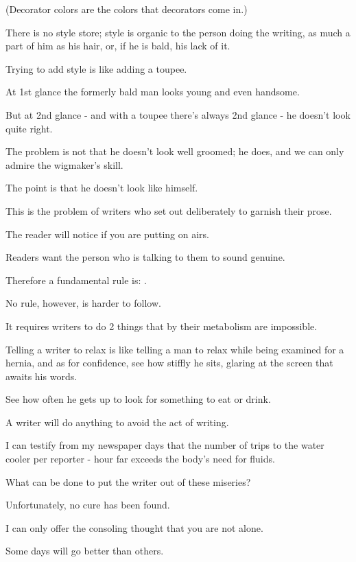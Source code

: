 \documentclass{book}
\numberwithin{equation}{section}
\begin{document}
(Decorator colors are the colors that decorators come in.)

There is no style store; style is organic to the person doing the writing, as much a part of him as his hair, or, if he is bald, his lack of it.

Trying to add style is like adding a toupee.

At 1st glance the formerly bald man looks young and even handsome.

But at 2nd glance - and with a toupee there's always 2nd glance - he doesn't look quite right.

The problem is not that he doesn't look well groomed; he does, and we can only admire the wigmaker's skill.

The point is that he doesn't look like himself.

%
This is the problem of writers who set out deliberately to garnish their prose.


The reader will notice if you are putting on airs.

Readers want the person who is talking to them to sound genuine.

Therefore a fundamental rule is: .

No rule, however, is harder to follow.

It requires writers to do 2 things that by their metabolism are impossible.


%
Telling a writer to relax is like telling a man to relax while being examined for a hernia, and as for confidence, see how stiffly he sits, glaring at the screen that awaits his words.

See how often he gets up to look for something to eat or drink.

A writer will do anything to avoid the act of writing.

I can testify from my newspaper days that the number of trips to the water cooler per reporter - hour far exceeds the body's need for fluids.

%
What can be done to put the writer out of these miseries?

Unfortunately, no cure has been found.

I can only offer the consoling thought that you are not alone.

Some days will go better than others.
\end{document}

